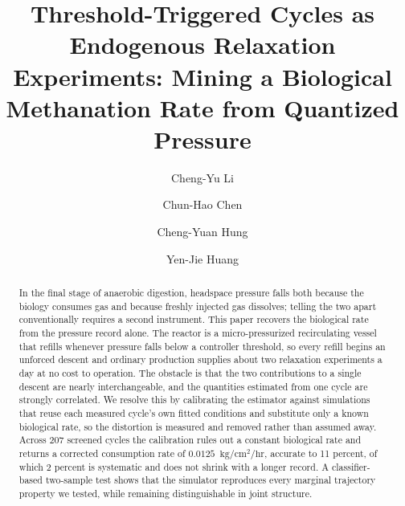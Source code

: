 \documentclass[runningheads]{llncs}
\newcommand{\ratu}{\ensuremath{\mathrm{kg/cm^{2}/hr}}}
\begin{document}
\title{Threshold-Triggered Cycles as Endogenous Relaxation
Experiments: Mining a Biological Methanation Rate from Quantized
Pressure}


\author{Cheng-Yu Li \and
Chun-Hao Chen \and
Cheng-Yuan Hung \and
Yen-Jie Huang}



\maketitle

\begin{abstract}
In the final stage of anaerobic digestion, headspace pressure falls
both because the biology consumes gas and because freshly injected gas
dissolves; telling the two apart conventionally requires a second
instrument. This paper recovers the biological rate from the pressure
record alone. The reactor is a micro-pressurized recirculating vessel
that refills whenever pressure falls below a controller threshold, so
every refill begins an unforced descent and ordinary production
supplies about two relaxation experiments a day at no cost to
operation. The obstacle is that the two contributions to a single
descent are nearly interchangeable, and the quantities estimated from
one cycle are strongly correlated. We resolve this by calibrating the estimator against
simulations that reuse each measured cycle's own fitted conditions and
substitute only a known biological rate, so the distortion is measured
and removed rather than assumed away. Across 207 screened
cycles the calibration rules out a constant biological rate and returns
a corrected consumption rate of $0.0125$~\ratu{},
accurate to 11 percent, of which 2 percent is systematic and does
not shrink with a longer record. A classifier-based two-sample test
shows that the simulator reproduces every marginal trajectory property
we tested, while remaining distinguishable in joint structure.

\end{abstract}
\end{document}
